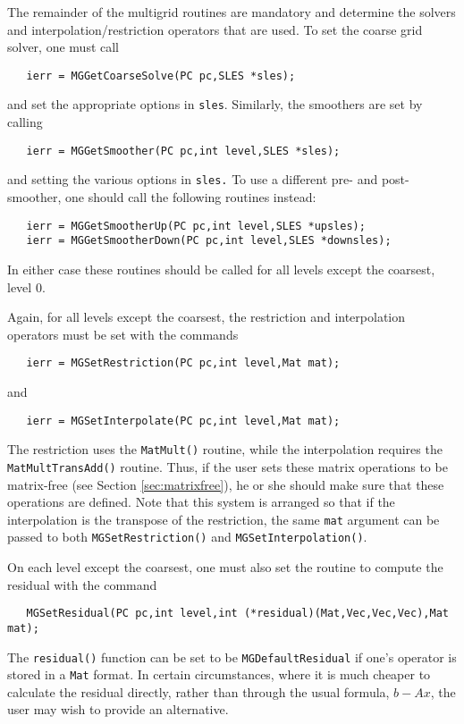 The remainder of the multigrid routines are mandatory and determine
the solvers and interpolation/restriction operators that are used.
To set the coarse grid solver, one must 
call 
\begin{verbatim}
   ierr = MGGetCoarseSolve(PC pc,SLES *sles);
\end{verbatim}
and set the appropriate options in {\tt sles}. Similarly, the 
smoothers are set by calling 
\begin{verbatim}
   ierr = MGGetSmoother(PC pc,int level,SLES *sles);
\end{verbatim}
and setting the various options in {\tt sles.} 
To use a different pre- and post-smoother, one should call the following
routines instead:  
\begin{verbatim}
   ierr = MGGetSmootherUp(PC pc,int level,SLES *upsles);
   ierr = MGGetSmootherDown(PC pc,int level,SLES *downsles);
\end{verbatim}
In either case these routines should be called for all levels except the 
coarsest, level 0.

Again, for all levels except the coarsest, the restriction and 
 interpolation operators 
must be set with the 
commands 
\begin{verbatim}
   ierr = MGSetRestriction(PC pc,int level,Mat mat);
\end{verbatim}
and 
\begin{verbatim}
   ierr = MGSetInterpolate(PC pc,int level,Mat mat);
\end{verbatim}
The restriction uses the {\tt MatMult()} routine, while the 
interpolation requires the {\tt MatMultTransAdd()} routine. 
Thus, if the user sets these matrix operations to be matrix-free
(see Section \ref{sec:matrixfree}),
he or she should make sure that these operations are defined. 
Note that this system is arranged so that if the interpolation is 
the transpose of the restriction, the same {\tt mat} argument can be 
passed to both {\tt MGSetRestriction()} and {\tt MGSetInterpolation()}.

On each level except the coarsest, one must also set the routine to 
compute the residual with the command 
\begin{verbatim}
   MGSetResidual(PC pc,int level,int (*residual)(Mat,Vec,Vec,Vec),Mat mat);
\end{verbatim}
The {\tt residual()} function can be set to be {\tt MGDefaultResidual}
if 
one's operator is stored in a {\tt Mat} format.  In certain circumstances, 
where it is much cheaper to calculate the residual directly, rather 
than through the usual formula, $b - Ax$,  the user may wish to provide 
an alternative. 

